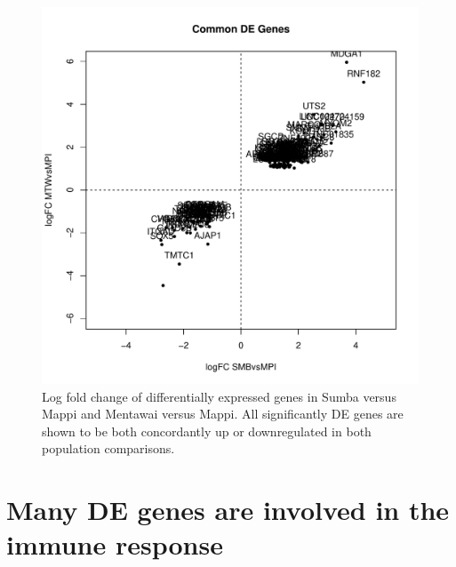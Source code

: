 \documentclass[12pt,a4paper,titlepage,twoside,openright]{book}
\begin{document}
\begin{mainmatter}
\begin{figure}[htb!]
\centering
\includegraphics[width=\textwidth,height=\textheight,keepaspectratio]{logFC_commonMPIgenes_dupCor.pdf}
\caption{Log fold change of differentially expressed genes in Sumba versus Mappi and Mentawai versus Mappi. All significantly DE genes are shown to be both concordantly up or downregulated in both population comparisons.}
\label{fig:LogFC: Mappi vs Others}
\end{figure}

\section{Many DE genes are involved in the immune response}


\end{mainmatter}
\end{document}
